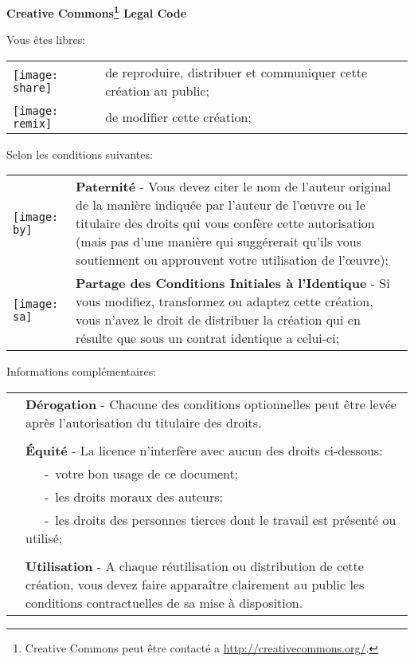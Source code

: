 \begin{center} \textbf{\LARGE{Creative Commons\footnote{Creative Commons peut être contacté a \url{http://creativecommons.org/}.} Legal Code}} \end{center}
\vspace{1cm}

\large Vous êtes libres:
\normalsize

\begin{center}
  \begin{tabular}{p{1cm} p{12cm}}
    \texttt{[image: share]} & de reproduire, distribuer et communiquer cette création au public;\\
    \texttt{[image: remix]} & de modifier cette création;\\
  \end{tabular}
\end{center}

\large Selon les conditions suivantes:
\normalsize

\begin{center}
  \begin{tabular}{p{1cm} p{12cm}}
    \texttt{[image: by]} & \textbf{Paternité} - Vous devez citer le nom de l'auteur original
    de la manière indiquée par l'auteur de l'œuvre ou le titulaire des
    droits qui vous confère cette autorisation (mais pas d'une manière
    qui suggérerait qu'ils vous soutiennent ou approuvent votre
    utilisation de l'œuvre);\\
    \texttt{[image: sa]} & \textbf{Partage des Conditions Initiales à l'Identique} -  Si vous
    modifiez, transformez ou adaptez cette création, vous n'avez le
    droit de distribuer la création qui en résulte que sous un contrat
    identique a celui-ci;\\
  \end{tabular}
\end{center}

\large Informations complémentaires:
\normalsize

\begin{tabular}{p{1cm} p{12cm}}
  \\
  & \textbf{Dérogation} - 
  Chacune des conditions optionnelles peut être levée après l'autorisation du titulaire des droits.\\
  \\
  & \textbf{Équité} - La licence n'interfère avec aucun des droits ci-dessous:\\
  & ~~~-~votre bon usage de ce document;\\
  & ~~~-~les droits moraux des auteurs;\\
  & ~~~-~les droits des personnes tierces dont le travail est présenté ou utilisé;\\
  \\
  & \textbf{Utilisation} - A chaque réutilisation ou distribution de cette création, vous devez faire apparaître clairement au public les conditions contractuelles de sa mise à disposition.
\end{tabular}

